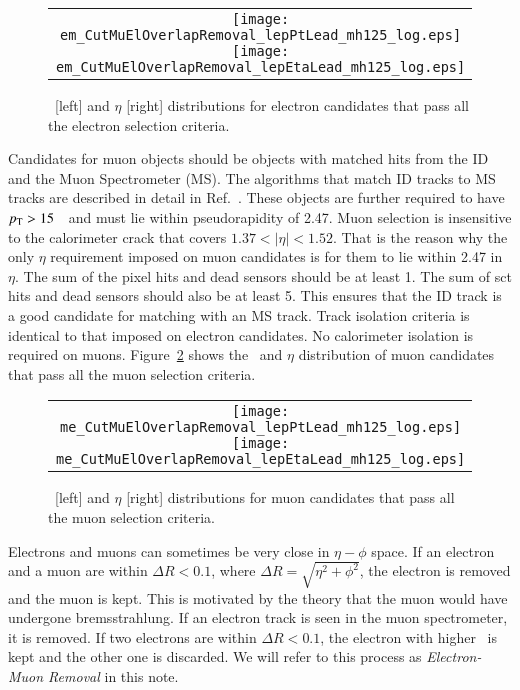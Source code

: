 \begin{figure}[!h]
\centering
\begin{tabular}{c}
	\texttt{[image: em\_CutMuElOverlapRemoval\_lepPtLead\_mh125\_log.eps]}
	\texttt{[image: em\_CutMuElOverlapRemoval\_lepEtaLead\_mh125\_log.eps]}\\
\end{tabular}
\caption{\pt\ [left] and $\eta$ [right] distributions for electron candidates that pass 
all the electron selection criteria. }
\label{fig:electrons}
\end{figure}
%
\par Candidates for muon objects should be objects with matched hits from the ID and the 
Muon Spectrometer (MS). The algorithms that match ID tracks to MS tracks are described 
in detail in Ref.~\cite{Aad2014rra}. These objects are further required to have 
$p_{\mathrm{T}} > 15$~\GeV\ and must lie within pseudorapidity of 2.47. Muon selection is insensitive 
to the calorimeter crack that covers $1.37<|\eta|<1.52$. That is the reason why the only $\eta$
requirement imposed on muon candidates is for them to lie within 2.47 in $\eta$.
The sum of the pixel hits and dead sensors should be at least 1.
The sum of sct hits and dead sensors should also be at least 5.  This ensures that the 
ID track is a good candidate for matching with an MS track. Track isolation criteria is 
identical to that imposed on electron candidates. No calorimeter isolation is required 
on muons. Figure~\ref{fig:muons} shows the \pt\ and $\eta$ distribution of muon candidates 
that pass all the muon selection criteria.

\begin{figure}[!h]
\centering
\begin{tabular}{c}
	\texttt{[image: me\_CutMuElOverlapRemoval\_lepPtLead\_mh125\_log.eps]}
	\texttt{[image: me\_CutMuElOverlapRemoval\_lepEtaLead\_mh125\_log.eps]}\\
\end{tabular}
\caption{\pt\ [left] and $\eta$ [right] distributions for muon candidates that pass all the 
muon selection criteria.}
\label{fig:muons}
\end{figure}

\par Electrons and muons can sometimes be very close in $\eta-\phi$ space. If an electron and 
a muon are within $\Delta R<0.1$, where $\Delta R = \sqrt{\eta^2 + \phi^2}$, the electron is removed and
the muon is kept. This is motivated by the theory that the muon would have undergone 
bremsstrahlung. If an electron track is seen in the muon spectrometer, it is removed. If two electrons are 
within $\Delta R<0.1$, the electron with higher \et\ is kept and the other one is discarded. We will 
refer to this process as {\it Electron-Muon Removal} in this note. 

